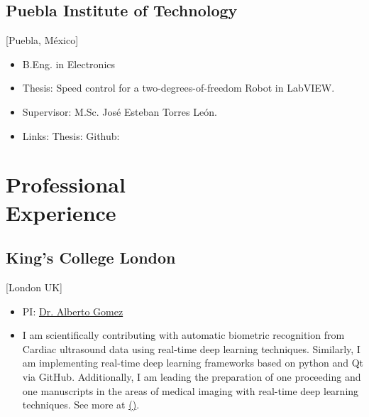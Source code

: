 \documentclass{mycv}
\begin{document}
\subsection{Puebla Institute of Technology}[Puebla, M\'exico]
\vspace{-\parskip}%
\begin{itemize}[label={}]
  \item B.Eng. in Electronics 
  \item Thesis: Speed control for a two-degrees-of-freedom Robot in LabVIEW.
  \item Supervisor: M.Sc. Jos\'e Esteban Torres Le\'on.
  \item	Links: Thesis: \href{https://github.com/mxochicale/publications/blob/master/thesis/B.Eng./doc/MPXochicale_BachelorEngThesis-2003.pdf}{\faFilePdfO} Github: \href{https://github.com/mxochicale/publications/tree/master/thesis/B.Eng.}{\faGithubAlt}
\end{itemize}

\section{Professional \\ Experience}

\subsection{King's College London}[London UK]
\begin{positions}
\end{positions}
\begin{itemize}
  \item PI: \href{https://gomezalberto.github.io/}{Dr. Alberto Gomez}
  \item I am scientifically contributing with automatic biometric recognition from Cardiac ultrasound data using real-time deep learning techniques.
  	Similarly, I am implementing real-time deep learning frameworks based on python and Qt via GitHub.
  	Additionally, I am leading the preparation of one proceeding and one manuscripts in the areas of medical imaging with real-time deep learning techniques.
	See more at \href{http://vital.oucru.org/major-partners/kings-college-london/}{(\faExternalLink)}.
\end{itemize}
\end{document}

